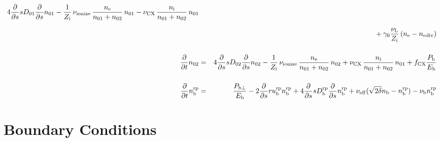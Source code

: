 \documentclass[11pt]{article}
\def\r#1{{\rm#1}}
\def\ddt{\frac{\partial}{\partial t}}
\def\dds{\frac{\partial}{\partial s}}
\def\ne{n_\r{e}}
\def\ni{n_\r{i}}
\def\nb{n_\r{b}}
\def\nna{n_{01}}
\def\nnb{n_{02}}
\def\Zi{Z_\r{i}}
\def\Pb{P_\r{b}}
\def\Eb{E_\r{b}}
\def\nbrp{n_\r{b}^\r{rp}}
\def\Pbperp{P_{\r{b}\perp}}
\def\nueff{\nu_\r{eff}}
\def\ubrp{u_\r{b}^\r{rp}}
\def\Dbrp{D_\r{b}^\r{rp}}
\def\fCX{f_\r{CX}}
\def\nuL{\nu_\r{L}}
\def\nuCX{\nu_\r{CX}}
\def\nuion{\nu_\r{ionize}}
\def\nub{\nu_\r{b}}
\def\nediv{n_\r{ediv}}
\begin{document}
\begin{eqnarray}
%
    4 \dds s D_{01} \dds \nna
%
  - \frac{1}{\Zi}\, \nuion\, \frac{\ne}{\nna+\nnb}\, \nna
%
  - \nuCX\, \frac{\ni}{\nna+\nnb}\, \nna
\nonumber\\[2.5mm]&&{}
%
  + \gamma_0 \frac{\nuL}{\Zi} \, (\ne - \nediv)
\\[5mm]
%
%
  \ddt \nnb &=& 
%
    4 \dds s D_{02} \dds \nnb
%
  - \frac{1}{\Zi}\, \nuion\, \frac{\ne}{\nna+\nnb}\, \nnb
%
  + \nuCX\, \frac{\ni}{\nna+\nnb}\, \nna
%
  + \fCX \frac{\Pb}{\Eb}
\\[5mm]
%
%
  \ddt \nbrp &=&
%
    \frac{\Pbperp}{\Eb}
%
  - 2 \dds r \ubrp \nbrp + 4 \dds s \Dbrp \dds \nbrp
%
  + \nueff (\sqrt{2\delta} \nb - \nbrp)
%
  - \nub \nbrp
%
\end{eqnarray}

\bigskip

\section{Boundary Conditions}
\end{document}

